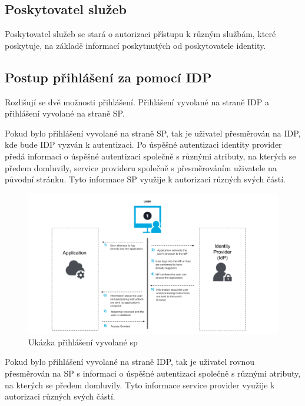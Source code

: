 \subsection{Poskytovatel služeb}

Poskytovatel služeb se stará o autorizaci přístupu k různým službám, které poskytuje, na základě informací poskytnutých od poskytovatele identity.

\subsection{Postup přihlášení za pomocí IDP}\label{IDPlogin}

Rozlišují se dvě možnosti přihlášení. Přihlášení vyvolané na straně IDP a přihlášení vyvolané na straně SP.


Pokud bylo přihlášení vyvolané na straně SP, tak je uživatel přesměrován na IDP, kde bude IDP vyzván k autentizaci.
Po úspěšné autentizaci identity provider předá informaci o úspěšné autentizaci společně s různými atributy, na kterých se předem domluvily, service provideru společně s přesměrováním uživatele na původní stránku.
Tyto informace SP využije k autorizaci různých svých částí.\cite{SAMLxOIDC}
\begin{figure}[bp]
	\centering
    \includegraphics[width=1.2\textwidth]{obrazky-figures/saml-sp.png}
	\caption{Ukázka přihlášení vyvolané sp\cite{SAMLxOIDC}}
	\label{saml-flow}
\end{figure}

Pokud bylo přihlášení vyvolané na straně IDP, tak je uživatel rovnou přesměrován na SP s informaci o úspěšné autentizaci společně s různými atributy, na kterých se předem domluvily.
Tyto informace service provider využije k autorizaci různých svých částí.\cite{SAMLxOIDC}

